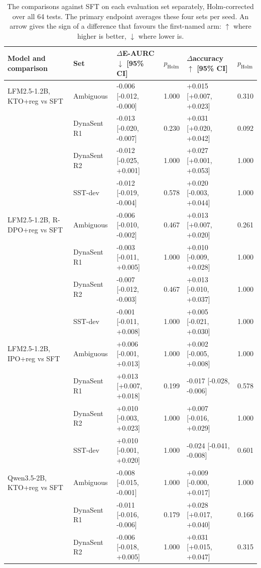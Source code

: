 \begin{table}[t]
\centering
\caption{The comparisons against SFT on each evaluation set separately, Holm-corrected over all 64 tests. The primary endpoint averages these four sets per seed. An arrow gives the sign of a difference that favours the first-named arm: $\uparrow$ where higher is better, $\downarrow$ where lower is.}
\label{tab:vs-sft-per-set}
\scriptsize
\begin{tabular}{llllll}
\toprule
Model and comparison & Set & $\Delta$E-AURC$\downarrow$ [95\% CI] & $p_{\mathrm{Holm}}$ & $\Delta$accuracy$\uparrow$ [95\% CI] & $p_{\mathrm{Holm}}$ \\
\midrule
LFM2.5-1.2B, KTO+reg vs SFT & Ambiguous & -0.006 [-0.012, -0.000] & 1.000 & +0.015 [+0.007, +0.023] & 0.310 \\
 & DynaSent R1 & -0.013 [-0.020, -0.007] & 0.230 & +0.031 [+0.020, +0.042] & 0.092 \\
 & DynaSent R2 & -0.012 [-0.025, +0.001] & 1.000 & +0.027 [+0.001, +0.053] & 1.000 \\
 & SST-dev & -0.012 [-0.019, -0.004] & 0.578 & +0.020 [-0.003, +0.044] & 1.000 \\
\addlinespace
LFM2.5-1.2B, R-DPO+reg vs SFT & Ambiguous & -0.006 [-0.010, -0.002] & 0.467 & +0.013 [+0.007, +0.020] & 0.261 \\
 & DynaSent R1 & -0.003 [-0.011, +0.005] & 1.000 & +0.010 [-0.009, +0.028] & 1.000 \\
 & DynaSent R2 & -0.007 [-0.012, -0.003] & 0.467 & +0.013 [-0.010, +0.037] & 1.000 \\
 & SST-dev & -0.001 [-0.011, +0.008] & 1.000 & +0.005 [-0.021, +0.030] & 1.000 \\
\addlinespace
LFM2.5-1.2B, IPO+reg vs SFT & Ambiguous & +0.006 [-0.001, +0.013] & 1.000 & +0.002 [-0.005, +0.008] & 1.000 \\
 & DynaSent R1 & +0.013 [+0.007, +0.018] & 0.199 & -0.017 [-0.028, -0.006] & 0.578 \\
 & DynaSent R2 & +0.010 [-0.003, +0.023] & 1.000 & +0.007 [-0.016, +0.029] & 1.000 \\
 & SST-dev & +0.010 [-0.001, +0.020] & 1.000 & -0.024 [-0.041, -0.008] & 0.601 \\
\addlinespace
Qwen3.5-2B, KTO+reg vs SFT & Ambiguous & -0.008 [-0.015, -0.001] & 1.000 & +0.009 [-0.000, +0.017] & 1.000 \\
 & DynaSent R1 & -0.011 [-0.016, -0.006] & 0.179 & +0.028 [+0.017, +0.040] & 0.166 \\
 & DynaSent R2 & -0.006 [-0.018, +0.005] & 1.000 & +0.031 [+0.015, +0.047] & 0.315 \\

\end{tabular}
\end{table}
